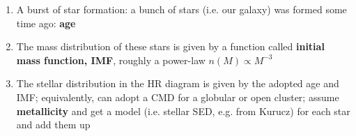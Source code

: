 \documentclass[letterpaper,landscape]{slides}
\begin{document}
\begin{slide}
{\begin{minipage}[t]{12cm}
\begin{enumerate}
\item {\color{blue} A burst of star formation:} a bunch of stars (i.e. our galaxy) 
      was formed some time ago: {\bf age}
\item {\color{blue} The mass distribution} of these stars is given by a function called
        {\bf initial mass function, IMF}, roughly a power-law $n(M) \propto M^{-3}$
\item {\color{blue} The stellar distribution in the HR diagram} is given by the adopted
      age and IMF; equivalently, can adopt a CMD for a globular or open cluster; assume
      {\bf metallicity} and get a model (i.e. stellar SED, e.g. from Kurucz) for each 
      star and add them up
\end{enumerate}

\end{minipage}}
\vfill 
\end{slide}
\end{document}
